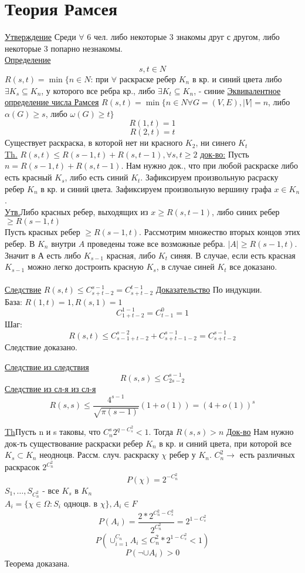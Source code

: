 \documentclass{article}
\begin{document}
 

\section{Теория Рамсея}

\underline{Утверждение}
Среди $\forall$ 6 чел. либо некоторые 3 знакомы друг с другом, либо некоторые 3 попарно незнакомы.\\
\underline{Определение}$$s,t \in N$$
$ R(s,t)=\min\{n \in N $: при $ \forall $ раскраске ребер $K_n$ в кр. и синий цвета либо $\exists K_s \subseteq K_n $, 
у  которого все ребра кр., либо $\exists K_t \subseteq K_n $, - синие
\underline{Эквивалентное определение числа Рамсея}
$R(s,t) = \min\{n \in N \forall G=(V,E), |V|=n$, либо $\alpha(G) \ge s$, либо $\omega(G) \ge t\}$\\
$$R(1,t) = 1$$
$$R(2,t) = t$$
Существует раскраска, в которой нет ни красного $K_2$, ни синего $K_t$\\

\underline{Th.} $R(s,t) \le R(s-1,t) + R(s,t-1), \forall s,t \ge 2$
\underline{док-во:}
Пусть $n=R(s-1,t) + R(s,t-1)$. Нам нужно док., что при любой раскраске либо есть красный $K_s$, либо есть синий $K_t$.
Зафиксируем произвольную расраску ребер $K_n$ в кр. и синий цвета.
Зафиксируем произвольную вершину графа $x \in K_n$.\\
\underline{Утв.}Либо красных ребер, выходящих из $x \ge R(s,t-1)$, либо синих ребер $\ge R(s-1,t)$\\
Пусть красных ребер $\ge R(s-1,t)$. Рассмотрим множество вторых концов этих ребер.
В $K_n$ внутри $A$ проведены тоже все возможные ребра. $|A| \ge R(s-1,t)$. 
Значит в А есть либо $K_{s-1}$ красная, либо $K_t$ синяя. 
В случае, если есть красная $K_{s-1}$ можно легко достроить красную $K_s$, в случае синей $K_t$ все доказано.\\
\\

\underline{Следствие}
$R(s,t) \le C_{s+t-2}^{s-1}=C_{s+t-2}^{t-1}$
\underline{Доказательство}
По индукции.\\
База:
$R(1,t)=1, R(s,1) = 1$
$$C_{1+t-2}^{1-1}=C_{t-1}^0=1$$
Шаг:$$R(s,t) \le C_{s-1+t-2}^{s-2} + C_{s+t-1-2}^{s-1}=C_{s+t-2}^{s-1}$$
Следствие доказано.

\underline{Следствие из следствия}
$$R(s,s) \le C_{2s-2}^{s-1}$$
\underline{Следствие из сл-я из сл-я}
$$R(s,s) \le \frac{4^{s-1}}{\sqrt{\pi(s-1)}}(1 + o(1)) = (4 + o(1))^s$$

\underline{Th}Пусть n  и s таковы, что $C_n^s2^{q-C_s^2}<1$. Тогда $R(s,s) > n$
\underline{Док-во}
Нам нужно док-ть существование раскраски ребер $K_n$ в кр. и синий  цвета, при которой все $K_s \subset K_n$ неодноцв.
Рассм. случ. раскраску $\chi$ ребер у $K_n$. $C_n^2 \to $ есть различных раскрасок $2^{C_n^2}$
$$P(\chi)=2^{-C_n^2}$$
$S_1,\ldots,S_{C_n^2}$ - все $K_s$ в $K_n$\\
$A_i = \{\chi \in \Omega: S_i$ одноцв. в $\chi\}, A_i \in F$
$$P(A_i)=\frac{2*2^{C_n^2-C_s^2}}{2^{C_n^2}}=2^{1-C_s^2}$$
$$P(\cup^{C_n}_{i=1}A_i \le C_n^2*2^{1-C_s^2} < 1)$$
$$P(\neg \cup A_i) > 0$$
Теорема доказана.\\
\\
\end{document}
